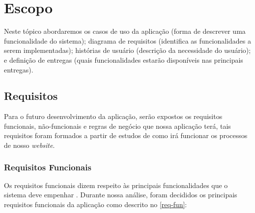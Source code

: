 \section{Escopo}

Neste tópico abordaremos os casos de uso da aplicação (forma de descrever uma
funcionalidade do sistema); diagrama de requisitos (identifica as funcionalidades a serem implementadas); histórias de usuário (descrição da necessidade do usuário); e definição de entregas (quais funcionalidades estarão disponíveis nas principais entregas).
\subsection{Requisitos}

Para o futuro desenvolvimento da aplicação, serão expostos os requisitos funcionais, não-funcionais e regras de negócio que nossa aplicação terá, tais requisitos foram formados a partir de estudos de como irá funcionar os processos de nosso \emph{website}.

\subsubsection{Requisitos Funcionais}

Os requisitos funcionais dizem respeito às principais funcionalidades que o sistema deve empenhar \cite{sommerville}. Durante nossa análise, foram decididos os principais requisitos funcionais da aplicação como descrito
no \autoref{req-fun}:


